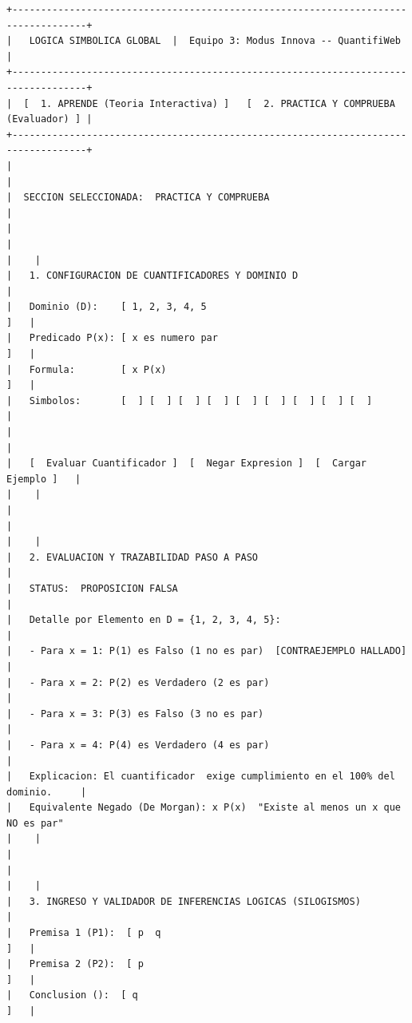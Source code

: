 \documentclass[11pt,a4paper,openany]{book}
\begin{document}
\begin{lstlisting}[language={},basicstyle=\ttfamily\scriptsize]
+-----------------------------------------------------------------------------------+
|   LOGICA SIMBOLICA GLOBAL  |  Equipo 3: Modus Innova -- QuantifiWeb             |
+-----------------------------------------------------------------------------------+
|  [  1. APRENDE (Teoria Interactiva) ]   [  2. PRACTICA Y COMPRUEBA (Evaluador) ] |
+-----------------------------------------------------------------------------------+
|                                                                                   |
|  SECCION SELECCIONADA:  PRACTICA Y COMPRUEBA                                     |
|                                                                                   |
|    |
|   1. CONFIGURACION DE CUANTIFICADORES Y DOMINIO D                               |
|   Dominio (D):    [ 1, 2, 3, 4, 5                                         ]   |
|   Predicado P(x): [ x es numero par                                       ]   |
|   Formula:        [ x P(x)                                               ]   |
|   Simbolos:       [  ] [  ] [  ] [  ] [  ] [  ] [  ] [  ] [  ]        |
|                                                                                 |
|   [  Evaluar Cuantificador ]  [  Negar Expresion ]  [  Cargar Ejemplo ]   |
|    |
|                                                                                   |
|    |
|   2. EVALUACION Y TRAZABILIDAD PASO A PASO                                      |
|   STATUS:  PROPOSICION FALSA                                                  |
|   Detalle por Elemento en D = {1, 2, 3, 4, 5}:                                   |
|   - Para x = 1: P(1) es Falso (1 no es par)  [CONTRAEJEMPLO HALLADO]           |
|   - Para x = 2: P(2) es Verdadero (2 es par)                                  |
|   - Para x = 3: P(3) es Falso (3 no es par)                                    |
|   - Para x = 4: P(4) es Verdadero (4 es par)                                  |
|   Explicacion: El cuantificador  exige cumplimiento en el 100% del dominio.     |
|   Equivalente Negado (De Morgan): x P(x)  "Existe al menos un x que NO es par"
|    |
|                                                                                   |
|    |
|   3. INGRESO Y VALIDADOR DE INFERENCIAS LOGICAS (SILOGISMOS)                    |
|   Premisa 1 (P1):  [ p  q                                                  ]   |
|   Premisa 2 (P2):  [ p                                                      ]   |
|   Conclusion ():  [ q                                                      ]   |

\end{lstlisting}
\end{document}
